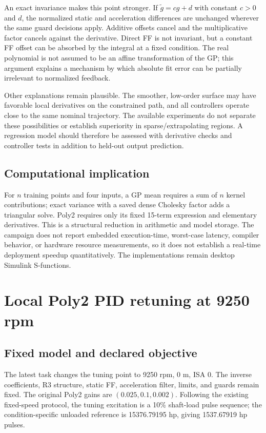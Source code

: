 An exact invariance makes this point stronger. If $\tilde g=cg+d$ with constant $c>0$ and $d$, the normalized static and acceleration differences are unchanged wherever the same guard decisions apply. Additive offsets cancel and the multiplicative factor cancels against the derivative. Direct FF is not invariant, but a constant FF offset can be absorbed by the integral at a fixed condition. The real polynomial is not assumed to be an affine transformation of the GP; this argument explains a mechanism by which absolute fit error can be partially irrelevant to normalized feedback.

Other explanations remain plausible. The smoother, low-order surface may have favorable local derivatives on the constrained path, and all controllers operate close to the same nominal trajectory. The available experiments do not separate these possibilities or establish superiority in sparse/extrapolating regions. A regression model should therefore be assessed with derivative checks and controller tests in addition to held-out output prediction.

\subsection{Computational implication}
For $n$ training points and four inputs, a GP mean requires a sum of $n$ kernel contributions; exact variance with a saved dense Cholesky factor adds a triangular solve. Poly2 requires only its fixed 15-term expression and elementary derivatives. This is a structural reduction in arithmetic and model storage. The campaign does not report embedded execution-time, worst-case latency, compiler behavior, or hardware resource measurements, so it does not establish a real-time deployment speedup quantitatively. The implementations remain desktop Simulink S-functions.




\section{Local Poly2 PID retuning at 9250 rpm}
\subsection{Fixed model and declared objective}
The latest task changes the tuning point to 9250 rpm, 0 m, ISA 0. The inverse coefficients, R3 structure, static FF, acceleration filter, limits, and guards remain fixed. The original Poly2 gains are $(0.025,0.1,0.002)$. Following the existing fixed-speed protocol, the tuning excitation is a 10\% shaft-load pulse sequence; the condition-specific unloaded reference is 15376.79195 hp, giving 1537.67919 hp pulses.

